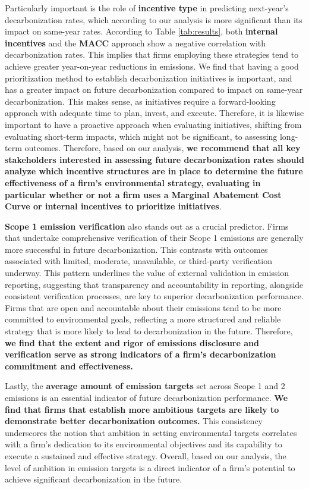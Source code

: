 Particularly important is the role of \textbf{incentive type} in predicting next-year's decarbonization rates, which according to our analysis is more significant than its impact on same-year rates. According to Table \ref{tab:results}, both \textbf{internal incentives} and the \textbf{MACC} approach show a negative correlation with decarbonization rates. This implies that firms employing these strategies tend to achieve greater year-on-year reductions in emissions. We find that having a good prioritization method to establish decarbonization initiatives is important, and has a greater impact on future decarbonization compared to impact on same-year decarbonization. This makes sense, as initiatives require a forward-looking approach with adequate time to plan, invest, and execute. Therefore, it is likewise important to have a proactive approach when evaluating initiatives, shifting from evaluating short-term impacts, which might not be significant, to assessing long-term outcomes. Therefore, based on our analysis, \textbf{we recommend that all key stakeholders interested in assessing future decarbonization rates should analyze which incentive structures are in place to determine the future effectiveness of a firm's environmental strategy, evaluating in particular whether or not a firm uses a Marginal Abatement Cost Curve or internal incentives to prioritize initiatives}.

\textbf{Scope 1 emission verification} also stands out as a crucial predictor. Firms that undertake comprehensive verification of their Scope 1 emissions are generally more successful in future decarbonization. This contrasts with outcomes associated with limited, moderate, unavailable, or third-party verification underway. This pattern underlines the value of external validation in emission reporting, suggesting that transparency and accountability in reporting, alongside consistent verification processes, are key to superior decarbonization performance. Firms that are open and accountable about their emissions tend to be more committed to environmental goals, reflecting a more structured and reliable strategy that is more likely to lead to decarbonization in the future. Therefore, \textbf{we find that the extent and rigor of emissions disclosure and verification serve as strong indicators of a firm's decarbonization commitment and effectiveness.}

Lastly, the \textbf{average amount of emission targets} set across Scope 1 and 2 emissions is an essential indicator of future decarbonization performance. \textbf{We find that firms that establish more ambitious targets are likely to demonstrate better decarbonization outcomes.} This consistency underscores the notion that ambition in setting environmental targets correlates with a firm's dedication to its environmental objectives and its capability to execute a sustained and effective strategy. Overall, based on our analysis, the level of ambition in emission targets is a direct indicator of a firm's potential to achieve significant decarbonization in the future.

